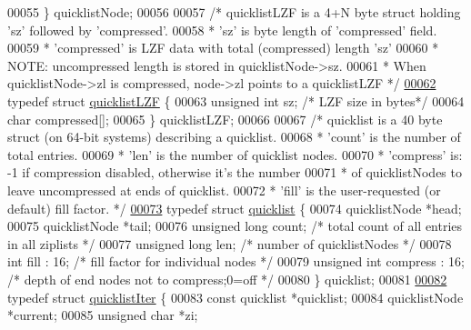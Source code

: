 \begin{DoxyCode}
00055 \} quicklistNode;
00056 
00057 \textcolor{comment}{/* quicklistLZF is a 4+N byte struct holding 'sz' followed by 'compressed'.}
00058 \textcolor{comment}{ * 'sz' is byte length of 'compressed' field.}
00059 \textcolor{comment}{ * 'compressed' is LZF data with total (compressed) length 'sz'}
00060 \textcolor{comment}{ * NOTE: uncompressed length is stored in quicklistNode->sz.}
00061 \textcolor{comment}{ * When quicklistNode->zl is compressed, node->zl points to a quicklistLZF */}
\hyperlink{structquicklistLZF}{00062} \textcolor{keyword}{typedef} \textcolor{keyword}{struct} \hyperlink{structquicklistLZF}{quicklistLZF} \{
00063     \textcolor{keywordtype}{unsigned} \textcolor{keywordtype}{int} sz; \textcolor{comment}{/* LZF size in bytes*/}
00064     \textcolor{keywordtype}{char} compressed[];
00065 \} quicklistLZF;
00066 
00067 \textcolor{comment}{/* quicklist is a 40 byte struct (on 64-bit systems) describing a quicklist.}
00068 \textcolor{comment}{ * 'count' is the number of total entries.}
00069 \textcolor{comment}{ * 'len' is the number of quicklist nodes.}
00070 \textcolor{comment}{ * 'compress' is: -1 if compression disabled, otherwise it's the number}
00071 \textcolor{comment}{ *                of quicklistNodes to leave uncompressed at ends of quicklist.}
00072 \textcolor{comment}{ * 'fill' is the user-requested (or default) fill factor. */}
\hyperlink{structquicklist}{00073} \textcolor{keyword}{typedef} \textcolor{keyword}{struct} \hyperlink{structquicklist}{quicklist} \{
00074     quicklistNode *head;
00075     quicklistNode *tail;
00076     \textcolor{keywordtype}{unsigned} \textcolor{keywordtype}{long} count;        \textcolor{comment}{/* total count of all entries in all ziplists */}
00077     \textcolor{keywordtype}{unsigned} \textcolor{keywordtype}{long} len;          \textcolor{comment}{/* number of quicklistNodes */}
00078     \textcolor{keywordtype}{int} fill : 16;              \textcolor{comment}{/* fill factor for individual nodes */}
00079     \textcolor{keywordtype}{unsigned} \textcolor{keywordtype}{int} compress : 16; \textcolor{comment}{/* depth of end nodes not to compress;0=off */}
00080 \} quicklist;
00081 
\hyperlink{structquicklistIter}{00082} \textcolor{keyword}{typedef} \textcolor{keyword}{struct} \hyperlink{structquicklistIter}{quicklistIter} \{
00083     \textcolor{keyword}{const} quicklist *quicklist;
00084     quicklistNode *current;
00085     \textcolor{keywordtype}{unsigned} \textcolor{keywordtype}{char} *zi;

\end{DoxyCode}
